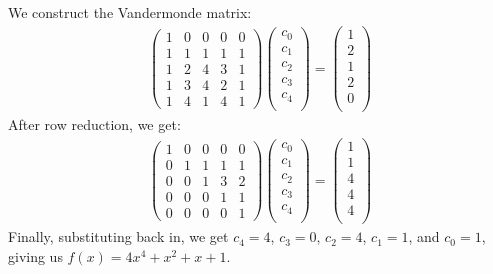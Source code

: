 \documentclass[11pt]{article}
\begin{document}
\subsection{} %
We construct the Vandermonde matrix:
\begin{align*}
	\begin{pmatrix}
		1 & 0 & 0 & 0 & 0\\
		1 & 1 & 1 & 1 & 1\\
		1 & 2 & 4 & 3 & 1\\
		1 & 3 & 4 & 2 & 1\\
		1 & 4 & 1 & 4 & 1
	\end{pmatrix}
	\begin{pmatrix}
		c_0\\
		c_1\\
		c_2\\
		c_3\\
		c_4\\
	\end{pmatrix}
	=
	\begin{pmatrix}
		1\\
		2\\
		1\\
		2\\
		0\\
	\end{pmatrix}
\end{align*}
After row reduction, we get:
\begin{align*}
	\begin{pmatrix}
		1 & 0 & 0 & 0 & 0\\
		0 & 1 & 1 & 1 & 1\\
		0 & 0 & 1 & 3 & 2\\
		0 & 0 & 0 & 1 & 1\\
		0 & 0 & 0 & 0 & 1
	\end{pmatrix}
	\begin{pmatrix}
		c_0\\
		c_1\\
		c_2\\
		c_3\\
		c_4\\
	\end{pmatrix}
	=
	\begin{pmatrix}
		1\\
		1\\
		4\\
		4\\
		4\\
	\end{pmatrix}
\end{align*}
Finally, substituting back in, we get $c_4=4$, $c_3=0$, $c_2=4$, $c_1=1$, and $c_0=1$, giving us $f(x)=4x^4+x^2+x+1$.
\end{document}
